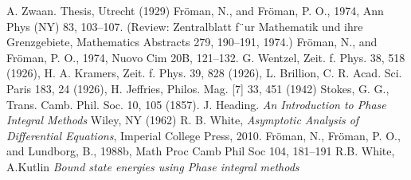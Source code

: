 \documentclass[12pt]{iopart}
\begin{document}
\begin{thebibliography}{10}
 A. Zwaan. Thesis, Utrecht (1929)
 Fr\"oman, N., and Fr\"oman, P. O., 1974, Ann Phys (NY) 83, 103–107. (Review: Zentralblatt
f¨ur Mathematik und ihre Grenzgebiete, Mathematics Abstracts 279, 190–191, 1974.)
 Fr\"oman, N., and Fr\"oman, P. O., 1974, Nuovo Cim 20B, 121–132.
 G. Wentzel, Zeit. f. Phys. 38, 518 (1926), H. A. Kramers,
 Zeit. f. Phys. 39, 828 (1926), L. Brillion, C. R. Acad. Sci. Paris 183, 
24 (1926), H. Jeffries, Philos. Mag. [7] 33, 451 (1942)
 Stokes, G. G., Trans. Camb. Phil. Soc. 10, 105 (1857).
 J. Heading. {\it An Introduction to Phase Integral Methods} 
Wiley, NY (1962)
 R. B. White,
 {\it Asymptotic Analysis of Differential Equations}, Imperial College Press, 2010.
 Fr\"oman, N., Fr\"oman, P. O., and Lundborg, B., 1988b, Math Proc Camb Phil Soc 104, 181–191
 R.B. White, A.Kutlin {\it Bound state energies using Phase integral methods} 
\end{thebibliography}
\end{document}
